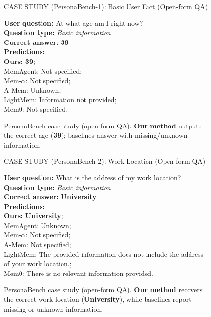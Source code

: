 \begin{figure}[!t]
\begin{AIboxOrangeFrame}{CASE STUDY (PersonaBench-1): Basic User Fact (Open-form QA)}
\vspace{1mm}
{\footnotesize
\setlength{\parindent}{0pt}
\setlength{\parskip}{2pt}

\textbf{User question:} At what age am I right now? \\
\textbf{Question type:} \textit{Basic information} \\

\textbf{Correct answer:} \textbf{39} \\
\textbf{Predictions:} \\
\textbf{Ours: 39}; \\
MemAgent: Not specified; \\
Mem-$\alpha$: Not specified; \\
A-Mem: Unknown; \\
LightMem: Information not provided; \\
Mem0: Not specified.
}
\end{AIboxOrangeFrame}
\vspace{-1em}
\caption{PersonaBench case study (open-form QA). \textbf{Our method} outputs the correct age (\textbf{39}); baselines answer with missing/unknown information.}
\label{fig:case_pb1_age}
\end{figure}

\begin{figure}[!t]
\begin{AIboxOrangeFrame}{CASE STUDY (PersonaBench-2): Work Location (Open-form QA)}
\vspace{1mm}
{\footnotesize
\setlength{\parindent}{0pt}
\setlength{\parskip}{2pt}

\textbf{User question:} What is the address of my work location? \\
\textbf{Question type:} \textit{Basic information} \\

\textbf{Correct answer:} \textbf{University} \\
\textbf{Predictions:} \\
\textbf{Ours: University}; \\
MemAgent: Unknown;\\
Mem-$\alpha$: Not specified; \\
A-Mem: Not specified; \\
LightMem: The provided information does not include the address of your work location.; \\
Mem0: There is no relevant information provided.
}
\end{AIboxOrangeFrame}
\vspace{-1em}
\caption{PersonaBench case study (open-form QA). \textbf{Our method} recovers the correct work location (\textbf{University}), while baselines report missing or unknown information.}
\label{fig:case_pb2_work}
\end{figure}



